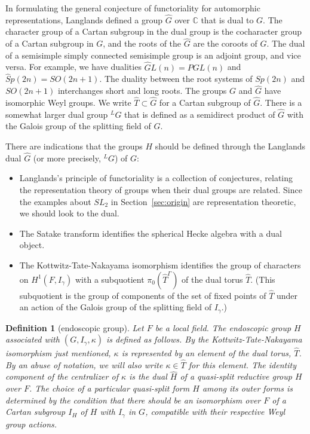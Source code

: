 \documentclass[brochure,english,12pt]{bourbaki}
\theoremstyle{plain}
\newtheorem{definition}[equation]{Definition}
\newcommand{\ring}[1]{\mathbb{#1}}
\begin{document}
In formulating the general conjecture of functoriality for automorphic
representations, Langlands defined a group $\hat G$ over $\ring{C}$
that is dual to $G$.  The character group of a Cartan subgroup in the
dual group is the cocharacter group of a Cartan subgroup in $G$, and
the roots of the $\hat G$ are the coroots of $G$.  The dual of a
semisimple simply connected semisimple group is an adjoint group, and
vice versa.  For example, we have dualities $\hat GL(n) = PGL(n)$ and
$\hat Sp(2n)=SO(2n+1)$.  The duality between the root systems of
$Sp(2n)$ and $SO(2n+1)$ interchanges short and long roots.  The groups
$G$ and $\hat G$ have isomorphic Weyl groups.  We write $\hat T\subset
\hat G$ for a Cartan subgroup of $\hat G$.  There is a somewhat larger
dual group ${}^LG$ that is defined as a semidirect product of $\hat G$
with the Galois group of the splitting field of $G$.

There are indications that the groups $H$ should be defined through  
the Langlands dual $\hat G$ (or more precisely, ${}^LG$) of $G$:
\begin{itemize}
\item Langlands's principle of functoriality is a collection of
  conjectures, relating  the representation theory of groups
  when their dual groups are related.  Since the
  examples about $SL_2$ in Section~\ref{sec:origin} are representation
  theoretic, we should look to the dual.
\item The Satake transform identifies the spherical Hecke algebra with
  a dual object.  
\item The Kottwitz-Tate-Nakayama isomorphism identifies the group of
  characters on $H^1(F,I_\gamma)$ with a subquotient $\pi_0(\hat T^\Gamma)$
  of the dual torus $\hat T$.  (This subquotient is the group of
  components of the set of fixed points of $\hat T$ under an action of the Galois group of the
splitting field of $I_\gamma$.)
\end{itemize}

\begin{definition}[endoscopic group]  Let $F$ be a local field.
  The {\it endoscopic group} $H$ associated with $(G,I_\gamma,\kappa)$ is defined
  as follows.  By the Kottwitz-Tate-Nakayama isomorphism just
  mentioned, $\kappa$ is represented by an element of the dual torus,
  $\hat T$.  By an abuse of notation, we will also write $\kappa\in
  \hat T$ for this element.  The identity component of the
  centralizer of $\kappa$ is the dual $\hat H$ of a quasi-split
  reductive group $H$ over $F$.  The choice of a particular quasi-split form $H$
  among its outer forms is determined by the condition that there should
  be an isomorphism over $F$ of a Cartan subgroup $I_H$ of $H$ with
  $I_\gamma$ in $G$, compatible with their respective Weyl group actions.
\end{definition}
\end{document}
